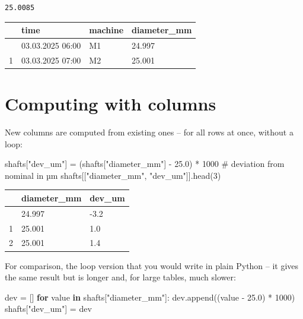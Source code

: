 \documentclass[
  letterpaper,
  DIV=11,
  numbers=noendperiod]{scrreprt}
\newenvironment{Shaded}{\begin{snugshade}}{\end{snugshade}}
\newcommand{\CommentTok}[1]{\textcolor[rgb]{0.37,0.37,0.37}{#1}}
\newcommand{\ControlFlowTok}[1]{\textcolor[rgb]{0.00,0.23,0.31}{\textbf{#1}}}
\newcommand{\DecValTok}[1]{\textcolor[rgb]{0.68,0.00,0.00}{#1}}
\newcommand{\FloatTok}[1]{\textcolor[rgb]{0.68,0.00,0.00}{#1}}
\newcommand{\KeywordTok}[1]{\textcolor[rgb]{0.00,0.23,0.31}{\textbf{#1}}}
\newcommand{\NormalTok}[1]{\textcolor[rgb]{0.00,0.23,0.31}{#1}}
\newcommand{\OperatorTok}[1]{\textcolor[rgb]{0.37,0.37,0.37}{#1}}
\newcommand{\StringTok}[1]{\textcolor[rgb]{0.13,0.47,0.30}{#1}}
\begin{document}
\begin{verbatim}
25.0085
\end{verbatim}

\begin{longtable}[]{@{}llll@{}}
\toprule\noalign{}
& time & machine & diameter\_mm \\
\midrule\noalign{}
\endhead
\bottomrule\noalign{}
\endlastfoot
0 & 03.03.2025 06:00 & M1 & 24.997 \\
1 & 03.03.2025 07:00 & M2 & 25.001 \\
\end{longtable}

\section*{Computing with columns}\label{computing-with-columns}


New columns are computed from existing ones -- for all rows at once,
without a loop:

\begin{Shaded}
\begin{Highlighting}[]
\NormalTok{shafts[}\StringTok{"dev\_um"}\NormalTok{] }\OperatorTok{=}\NormalTok{ (shafts[}\StringTok{"diameter\_mm"}\NormalTok{] }\OperatorTok{{-}} \FloatTok{25.0}\NormalTok{) }\OperatorTok{*} \DecValTok{1000}      \CommentTok{\# deviation from nominal in µm}
\NormalTok{shafts[[}\StringTok{"diameter\_mm"}\NormalTok{, }\StringTok{"dev\_um"}\NormalTok{]].head(}\DecValTok{3}\NormalTok{)}
\end{Highlighting}
\end{Shaded}

\begin{longtable}[]{@{}lll@{}}
\toprule\noalign{}
& diameter\_mm & dev\_um \\
\midrule\noalign{}
\endhead
\bottomrule\noalign{}
\endlastfoot
0 & 24.997 & -3.2 \\
1 & 25.001 & 1.0 \\
2 & 25.001 & 1.4 \\
\end{longtable}

For comparison, the loop version that you would write in plain Python --
it gives the same result but is longer and, for large tables, much
slower:

\begin{Shaded}
\begin{Highlighting}[]
\NormalTok{dev }\OperatorTok{=}\NormalTok{ []}
\ControlFlowTok{for}\NormalTok{ value }\KeywordTok{in}\NormalTok{ shafts[}\StringTok{"diameter\_mm"}\NormalTok{]:}
\NormalTok{    dev.append((value }\OperatorTok{{-}} \FloatTok{25.0}\NormalTok{) }\OperatorTok{*} \DecValTok{1000}\NormalTok{)}
\NormalTok{shafts[}\StringTok{"dev\_um"}\NormalTok{] }\OperatorTok{=}\NormalTok{ dev}
\end{Highlighting}
\end{Shaded}
\end{document}

